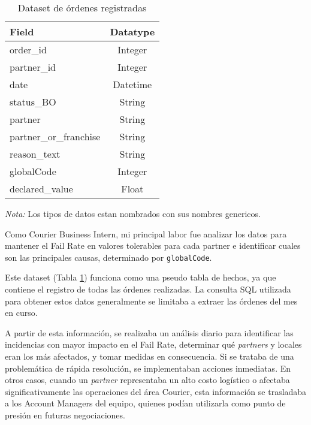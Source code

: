 \begin{table}[H]
	\caption{Dataset de órdenes registradas}
	\raggedright
	\label{tab:main_dataset}
	\begin{threeparttable}
		\begin{tabular}{lc}
			\toprule
			\textbf{Field}         & \textbf{Datatype} \\
			\midrule
			order\_id              & Integer           \\
			partner\_id            & Integer           \\
			date                   & Datetime          \\
			status\_BO             & String            \\
			partner                & String            \\
			partner\_or\_franchise & String            \\
			reason\_text           & String            \\
			globalCode             & Integer           \\
			declared\_value        & Float             \\
			\bottomrule
		\end{tabular}
		\begin{tablenotes}[para]
			\small
			\textit{Nota:} Los tipos de datos estan nombrados con sus nombres genericos.
		\end{tablenotes}
	\end{threeparttable}
\end{table}

Como Courier Business Intern, mi principal labor fue analizar los datos para mantener el Fail Rate en valores tolerables para cada partner e identificar cuales son las principales causas, determinado por \texttt{globalCode}.

Este dataset (Tabla \ref{tab:main_dataset}) funciona como una pseudo tabla de hechos, ya que contiene el registro de todas las órdenes realizadas. La consulta SQL utilizada para obtener estos datos generalmente se limitaba a extraer las órdenes del mes en curso.

A partir de esta información, se realizaba un análisis diario para identificar las incidencias con mayor impacto en el Fail Rate, determinar qué \textit{partners} y locales eran los más afectados, y tomar medidas en consecuencia. Si se trataba de una problemática de rápida resolución, se implementaban acciones inmediatas. En otros casos, cuando un \textit{partner} representaba un alto costo logístico o afectaba significativamente las operaciones del área Courier, esta información se trasladaba a los Account Managers del equipo, quienes podían utilizarla como punto de presión en futuras negociaciones.


